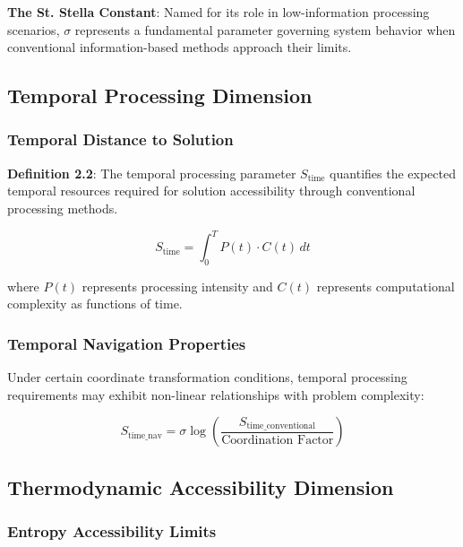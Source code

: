 \documentclass[11pt]{article}
\begin{document}
\textbf{The St. Stella Constant}: Named for its role in low-information processing scenarios, $\sigma$ represents a fundamental parameter governing system behavior when conventional information-based methods approach their limits.

\subsection{Temporal Processing Dimension}

\subsubsection{Temporal Distance to Solution}

\textbf{Definition 2.2}: The temporal processing parameter $S_{\text{time}}$ quantifies the expected temporal resources required for solution accessibility through conventional processing methods.

\begin{equation}
S_{\text{time}} = \int_0^T P(t) \cdot C(t) \, dt
\label{eq:temporal_processing}
\end{equation}

where $P(t)$ represents processing intensity and $C(t)$ represents computational complexity as functions of time.

\subsubsection{Temporal Navigation Properties}

Under certain coordinate transformation conditions, temporal processing requirements may exhibit non-linear relationships with problem complexity:

\begin{equation}
S_{\text{time\_nav}} = \sigma \log\left(\frac{S_{\text{time\_conventional}}}{\text{Coordination Factor}}\right)
\label{eq:temporal_navigation}
\end{equation}

\subsection{Thermodynamic Accessibility Dimension}

\subsubsection{Entropy Accessibility Limits}
\end{document}
